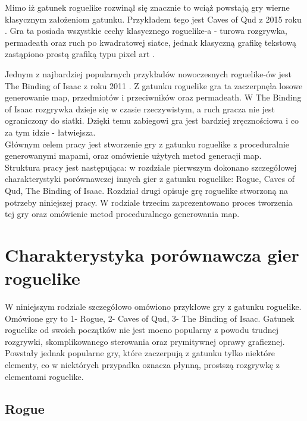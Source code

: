 \documentclass[12pt,twoside]{article}
\begin{document}
Mimo iż gatunek roguelike rozwinął się znacznie to wciąż powstają gry wierne klasycznym założeniom gatunku. Przykładem tego jest Caves of Qud z 2015 roku \cite{game_coq}. Gra ta posiada wszystkie cechy klasycznego roguelike-a - turowa rozgrywka, permadeath oraz ruch po kwadratowej siatce, jednak klasyczną grafikę tekstową zastąpiono prostą grafiką typu pixel art \cite{source_pixelart}.

Jednym z najbardziej popularnych przykładów nowoczesnych roguelike-ów jest The Binding of Isaac z roku 2011 \cite{game_tboi}. Z gatunku roguelike gra ta zaczerpnęła losowe generowanie map, przedmiotów i przeciwników oraz permadeath. W The Binding of Isaac rozgrywka dzieje się w czasie rzeczywistym, a ruch gracza nie jest ograniczony do siatki. Dzięki temu zabiegowi gra jest bardziej zręcznościowa i co za tym idzie -  łatwiejsza.\\

Głównym celem pracy jest stworzenie gry z gatunku roguelike z proceduralnie generowanymi mapami, oraz omówienie użytych metod generacji map. \\

Struktura pracy jest następująca: w rozdziale pierwszym dokonano szczegółowej charakterystyki porównawczej innych gier z gatunku roguelike: Rogue, Caves of Qud, The Binding of Isaac. Rozdział drugi opisuje grę roguelike stworzoną na potrzeby niniejszej pracy. W rodziale trzecim zaprezentowano proces tworzenia tej gry oraz omówienie metod proceduralnego generowania map.


\clearpage

\section{Charakterystyka porównawcza gier roguelike}

W niniejszym rodziale szczegółowo omówiono przykłowe gry z gatunku roguelike. Omówione gry to 1- Rogue, 2- Caves of Qud, 3- The Binding of Isaac. Gatunek roguelike od swoich początków nie jest mocno popularny z powodu trudnej rozgrywki, skomplikowanego sterowania oraz prymitywnej oprawy graficznej. Powstały jednak popularne gry, które zaczerpują z gatunku tylko niektóre elementy, co w niektórych przypadka oznacza płynną, prostszą rozgrywkę z elementami roguelike.

\subsection{Rogue}
\end{document}
